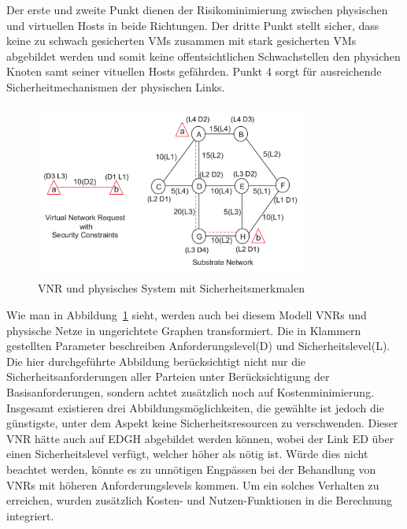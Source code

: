 \documentclass{lni}
\begin{document}
Der erste und zweite Punkt dienen der Risikominimierung zwischen physischen und virtuellen Hosts in beide Richtungen. Der dritte Punkt stellt sicher, dass keine zu schwach gesicherten VMs zusammen mit stark gesicherten VMs abgebildet werden und somit keine offentsichtlichen Schwachstellen den physichen Knoten samt seiner vituellen Hosts gefährden. Punkt 4 sorgt für ausreichende Sicherheitmechanismen der physischen Links.

\begin{figure}[htb]
\begin{center}
	\includegraphics[width=0.8\textwidth]{algo2graph.pdf}\newline
	\caption{\label{graph11} VNR und physisches System mit Sicherheitsmerkmalen\cite{algo2}}
\end{center}
\end{figure}

Wie man in Abbildung~\ref{graph11} sieht, werden auch bei diesem Modell VNRs und physische Netze in ungerichtete Graphen transformiert. Die in Klammern gestellten Parameter beschreiben Anforderungslevel(D) und Sicherheitslevel(L). Die hier durchgeführte Abbildung berücksichtigt nicht nur die Sicherheitsanforderungen aller Parteien unter Berücksichtigung der Basisanforderungen, sondern achtet zusätzlich noch auf Kostenminimierung. Insgesamt existieren drei Abbildungsmöglichkeiten, die gewählte ist jedoch die günstigste, unter dem Aspekt keine Sicherheitsresourcen zu verschwenden. Dieser VNR hätte auch auf EDGH abgebildet werden können, wobei der Link ED über einen Sicherheitslevel verfügt, welcher höher als nötig ist. Würde dies nicht beachtet werden, könnte es zu unnötigen Engpässen bei der Behandlung von VNRs mit höheren Anforderungslevels kommen. Um ein solches Verhalten zu erreichen, wurden zusätzlich Kosten- und Nutzen-Funktionen in die Berechnung integriert.
\end{document}

